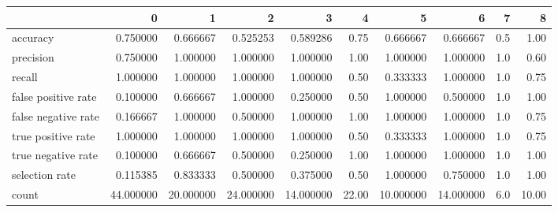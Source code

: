 \begin{tabular}{lrrrrrrrrr}
\toprule
{} &          0 &          1 &          2 &          3 &      4 &          5 &          6 &    7 &      8 \\
\midrule
accuracy            &   0.750000 &   0.666667 &   0.525253 &   0.589286 &   0.75 &   0.666667 &   0.666667 &  0.5 &   1.00 \\
precision           &   0.750000 &   1.000000 &   1.000000 &   1.000000 &   1.00 &   1.000000 &   1.000000 &  1.0 &   0.60 \\
recall              &   1.000000 &   1.000000 &   1.000000 &   1.000000 &   0.50 &   0.333333 &   1.000000 &  1.0 &   0.75 \\
false positive rate &   0.100000 &   0.666667 &   1.000000 &   0.250000 &   0.50 &   1.000000 &   0.500000 &  1.0 &   1.00 \\
false negative rate &   0.166667 &   1.000000 &   0.500000 &   1.000000 &   1.00 &   1.000000 &   1.000000 &  1.0 &   0.75 \\
true positive rate  &   1.000000 &   1.000000 &   1.000000 &   1.000000 &   0.50 &   0.333333 &   1.000000 &  1.0 &   0.75 \\
true negative rate  &   0.100000 &   0.666667 &   0.500000 &   0.250000 &   1.00 &   1.000000 &   1.000000 &  1.0 &   1.00 \\
selection rate      &   0.115385 &   0.833333 &   0.500000 &   0.375000 &   0.50 &   1.000000 &   0.750000 &  1.0 &   1.00 \\
count               &  44.000000 &  20.000000 &  24.000000 &  14.000000 &  22.00 &  10.000000 &  14.000000 &  6.0 &  10.00 \\
\bottomrule
\end{tabular}

